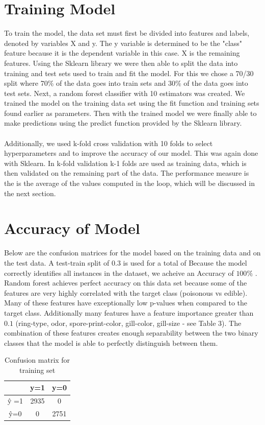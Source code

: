 \documentclass[]{article}
\begin{document}
\section{Training Model}
To train the model, the data set must first be divided into features and labels, denoted by variables X and y. The y variable is determined to be the "class" feature because it is the dependent variable in this case. X is the remaining features. Using the Sklearn library we were then able to split the data into training and test sets used to train and fit the model. For this we chose a 70/30 split where 70\% of the data goes into train sets and 30\% of the data goes into test sets. Next, a random forest classifier with 10 estimators was created. We trained the model on the training data set using the fit function and training sets found earlier as parameters. Then with the trained model we were finally able to make predictions using the predict function provided by the Sklearn library.
\\
\\
Additionally, we used k-fold cross validation with 10 folds to select hyperparameters and to improve the accuracy of our model. This was again done with Sklearn. In k-fold validation k-1 folds are used as training data, which is then validated on the remaining part of the data. The performance measure is the is the average of the values computed in the loop, which will be discussed in the next section.

\section{Accuracy of Model}
Below are the confusion matrices for the model based on the training data and on the test data. A test-train split of $0.3$ is used for a total of  Because the model correctly identifies all instances in the dataset, we acheive an Accuracy of $100\%$ .
Random forest achieves perfect accuracy on this data set because some of the features are very highly correlated with the target class (poisonous vs edible). Many of these features have exceptionally low p-values when compared to the target class. Additionally many features have a feature importance greater than $0.1$ (ring-type, odor, spore-print-color, gill-color, gill-size - see Table 3). The combination of these features creates enough separability between the two binary classes that the model is able to perfectly distinguish between them. 

\begin{table}[h]
    \centering
    \begin{tabular}{|c|c|c|} \hline 
         &  y=1& y=0\\ \hline 
          ŷ =1&  2935& 0\\ \hline 
           ŷ=0&  0& 2751\\ \hline
    \end{tabular}
    \caption{Confusion matrix for training set}
    \label{tab:my_label}
\end{table}
 
\end{document}
